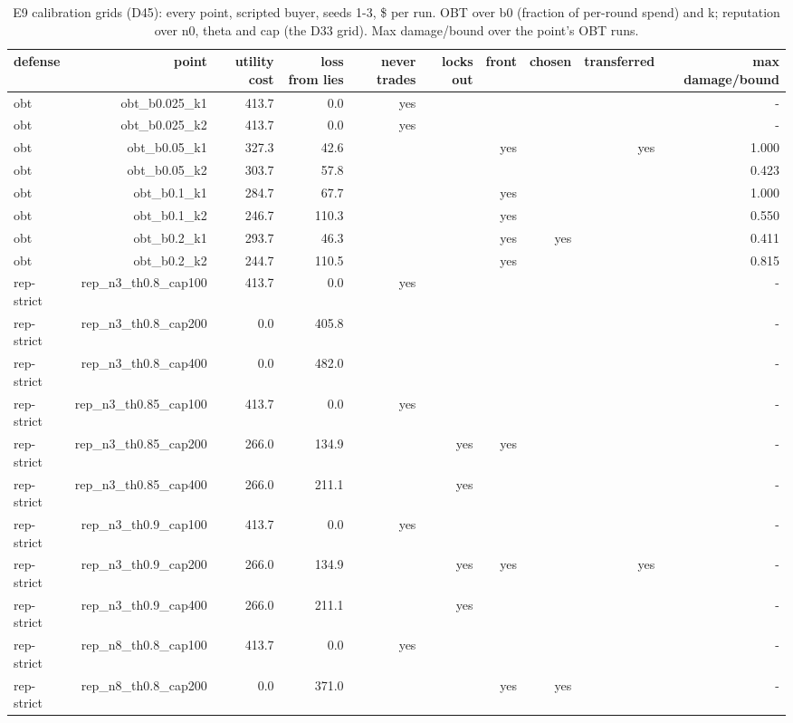 \begin{table}[t]
\centering
\small
\caption{E9 calibration grids (D45): every point, scripted buyer, seeds 1-3, \$ per run. OBT over b0 (fraction of per-round spend) and k; reputation over n0, theta and cap (the D33 grid). Max damage/bound over the point's OBT runs.}
\label{tab:e9_calibration_grid}
\begin{tabular}{lrrrrrrrrr}
\toprule
defense & point & utility cost & loss from lies & never trades & locks out & front & chosen & transferred & max damage/bound \\
\midrule
obt & obt\_b0.025\_k1 & 413.7 & 0.0 & yes &  &  &  &  & - \\
obt & obt\_b0.025\_k2 & 413.7 & 0.0 & yes &  &  &  &  & - \\
obt & obt\_b0.05\_k1 & 327.3 & 42.6 &  &  & yes &  & yes & 1.000 \\
obt & obt\_b0.05\_k2 & 303.7 & 57.8 &  &  &  &  &  & 0.423 \\
obt & obt\_b0.1\_k1 & 284.7 & 67.7 &  &  & yes &  &  & 1.000 \\
obt & obt\_b0.1\_k2 & 246.7 & 110.3 &  &  & yes &  &  & 0.550 \\
obt & obt\_b0.2\_k1 & 293.7 & 46.3 &  &  & yes & yes &  & 0.411 \\
obt & obt\_b0.2\_k2 & 244.7 & 110.5 &  &  & yes &  &  & 0.815 \\
rep-strict & rep\_n3\_th0.8\_cap100 & 413.7 & 0.0 & yes &  &  &  &  & - \\
rep-strict & rep\_n3\_th0.8\_cap200 & 0.0 & 405.8 &  &  &  &  &  & - \\
rep-strict & rep\_n3\_th0.8\_cap400 & 0.0 & 482.0 &  &  &  &  &  & - \\
rep-strict & rep\_n3\_th0.85\_cap100 & 413.7 & 0.0 & yes &  &  &  &  & - \\
rep-strict & rep\_n3\_th0.85\_cap200 & 266.0 & 134.9 &  & yes & yes &  &  & - \\
rep-strict & rep\_n3\_th0.85\_cap400 & 266.0 & 211.1 &  & yes &  &  &  & - \\
rep-strict & rep\_n3\_th0.9\_cap100 & 413.7 & 0.0 & yes &  &  &  &  & - \\
rep-strict & rep\_n3\_th0.9\_cap200 & 266.0 & 134.9 &  & yes & yes &  & yes & - \\
rep-strict & rep\_n3\_th0.9\_cap400 & 266.0 & 211.1 &  & yes &  &  &  & - \\
rep-strict & rep\_n8\_th0.8\_cap100 & 413.7 & 0.0 & yes &  &  &  &  & - \\
rep-strict & rep\_n8\_th0.8\_cap200 & 0.0 & 371.0 &  &  & yes & yes &  & - \\

\end{tabular}
\end{table}
